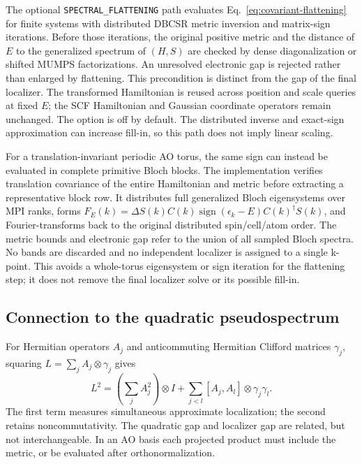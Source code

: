 The optional \texttt{SPECTRAL\_FLATTENING} path evaluates
Eq.~\eqref{eq:covariant-flattening} for finite systems with
distributed DBCSR metric inversion and matrix-sign iterations.
Before those iterations,
the original positive metric and the distance of $E$ to the
generalized spectrum of $(H,S)$ are checked by dense diagonalization
or shifted MUMPS factorizations. An unresolved electronic gap is
rejected rather than enlarged by flattening. This precondition is
distinct from the gap of the final localizer. The transformed
Hamiltonian is reused across position and scale queries at fixed
$E$; the SCF Hamiltonian and Gaussian coordinate operators remain
unchanged. The option is off by default. The distributed inverse
and exact-sign approximation can increase fill-in, so this path
does not imply linear scaling.

For a translation-invariant periodic AO torus, the same sign can
instead be evaluated in complete primitive Bloch blocks.
The implementation verifies translation covariance of the entire
Hamiltonian and metric before extracting a representative block row.
It distributes full generalized Bloch eigensystems over MPI ranks,
forms $F_E(k)=\Delta S(k)C(k)\operatorname{sign}(\epsilon_k-E)
C(k)^\dagger S(k)$, and Fourier-transforms back to the original
distributed spin/cell/atom order. The metric bounds and electronic
gap refer to the union of all sampled Bloch spectra. No bands are
discarded and no independent localizer is assigned to a single
k-point. This avoids a whole-torus eigensystem or sign iteration
for the flattening step; it does not remove the final localizer
solve or its possible fill-in.

\subsection{Connection to the quadratic pseudospectrum}
For Hermitian operators $A_j$ and anticommuting Hermitian Clifford
matrices $\gamma_j$, squaring $L=\sum_jA_j\otimes\gamma_j$ gives
\begin{equation}
 L^2=\left(\sum_j A_j^2\right)\otimes I+
 \sum_{j<l}[A_j,A_l]\otimes\gamma_j\gamma_l .
 \label{eq:clifford-square}
\end{equation}
The first term measures simultaneous approximate localization;
the second retains noncommutativity.
The quadratic gap and localizer gap are related, but not
interchangeable. In an AO basis each projected product must
include the metric, or be evaluated after orthonormalization.
